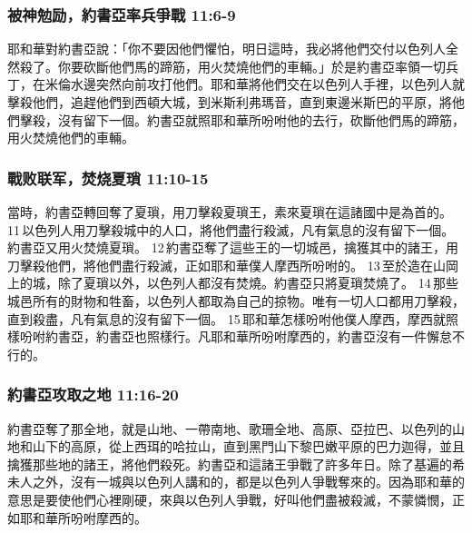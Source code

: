 \subsubsection{被神勉励，約書亞率兵爭戰 11:6-9}
耶和華對約書亞說：「你不要因他們懼怕，明日這時，我必將他們交付以色列人全然殺了。你要砍斷他們馬的蹄筋，用火焚燒他們的車輛。」於是約書亞率領一切兵丁，在米倫水邊突然向前攻打他們。耶和華將他們交在以色列人手裡，以色列人就擊殺他們，追趕他們到西頓大城，到米斯利弗瑪音，直到東邊米斯巴的平原，將他們擊殺，沒有留下一個。約書亞就照耶和華所吩咐他的去行，砍斷他們馬的蹄筋，用火焚燒他們的車輛。
  \sffamily{}  

\subsubsection{戰败联军，焚烧夏瑣 11:10-15}
當時，約書亞轉回奪了夏瑣，用刀擊殺夏瑣王，素來夏瑣在這諸國中是為首的。 11 以色列人用刀擊殺城中的人口，將他們盡行殺滅，凡有氣息的沒有留下一個。約書亞又用火焚燒夏瑣。 12 約書亞奪了這些王的一切城邑，擒獲其中的諸王，用刀擊殺他們，將他們盡行殺滅，正如耶和華僕人摩西所吩咐的。 13 至於造在山岡上的城，除了夏瑣以外，以色列人都沒有焚燒。約書亞只將夏瑣焚燒了。 14 那些城邑所有的財物和牲畜，以色列人都取為自己的掠物。唯有一切人口都用刀擊殺，直到殺盡，凡有氣息的沒有留下一個。 15 耶和華怎樣吩咐他僕人摩西，摩西就照樣吩咐約書亞，約書亞也照樣行。凡耶和華所吩咐摩西的，約書亞沒有一件懈怠不行的。

\subsubsection{約書亞攻取之地 11:16-20}
約書亞奪了那全地，就是山地、一帶南地、歌珊全地、高原、亞拉巴、以色列的山地和山下的高原，從上西珥的哈拉山，直到黑門山下黎巴嫩平原的巴力迦得，並且擒獲那些地的諸王，將他們殺死。約書亞和這諸王爭戰了許多年日。除了基遍的希未人之外，沒有一城與以色列人講和的，都是以色列人爭戰奪來的。因為耶和華的意思是要使他們心裡剛硬，來與以色列人爭戰，好叫他們盡被殺滅，不蒙憐憫，正如耶和華所吩咐摩西的。

